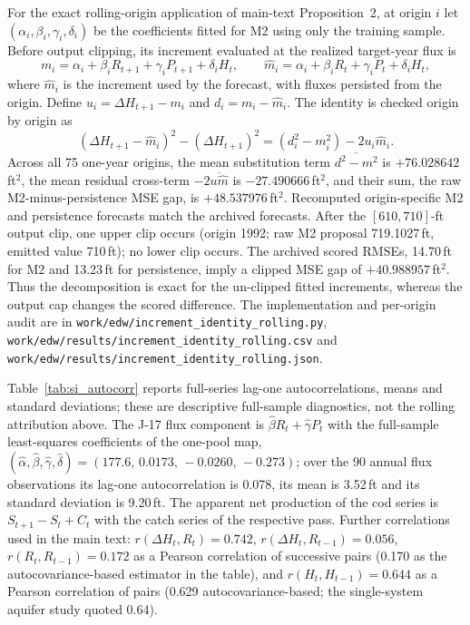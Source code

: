 For the exact rolling-origin application of main-text Proposition~2, at origin $i$ let $(\alpha_i,\beta_i,\gamma_i,\delta_i)$ be the coefficients fitted for M2 using only the training sample. Before output clipping, its increment evaluated at the realized target-year flux is
\[
m_i=\alpha_i+\beta_iR_{t+1}+\gamma_iP_{t+1}+\delta_iH_t,
\qquad \hat m_i=\alpha_i+\beta_iR_t+\gamma_iP_t+\delta_iH_t,
\]
where $\hat m_i$ is the increment used by the forecast, with fluxes persisted from the origin. Define $u_i=\Delta H_{t+1}-m_i$ and $d_i=m_i-\hat m_i$. The identity is checked origin by origin as
\[
(\Delta H_{t+1}-\hat m_i)^2-(\Delta H_{t+1})^2
= (d_i^2-m_i^2)-2u_i\hat m_i.
\]
Across all 75 one-year origins, the mean substitution term $\overline{d^2-m^2}$ is $+76.028642$\,ft$^2$, the mean residual cross-term $-2\overline{u\hat m}$ is $-27.490666$\,ft$^2$, and their sum, the raw M2-minus-persistence MSE gap, is $+48.537976$\,ft$^2$. Recomputed origin-specific M2 and persistence forecasts match the archived forecasts. After the $[610,710]$-ft output clip, one upper clip occurs (origin 1992; raw M2 proposal 719.1027\,ft, emitted value 710\,ft); no lower clip occurs. The archived scored RMSEs, 14.70\,ft for M2 and 13.23\,ft for persistence, imply a clipped MSE gap of $+40.988957$\,ft$^2$. Thus the decomposition is exact for the un-clipped fitted increments, whereas the output cap changes the scored difference. The implementation and per-origin audit are in \texttt{work/edw/increment\_identity\_rolling.py}, \texttt{work/edw/results/increment\_identity\_rolling.csv} and \texttt{work/edw/results/increment\_identity\_rolling.json}.

Table~\ref{tab:si_autocorr} reports full-series lag-one autocorrelations, means and standard deviations; these are descriptive full-sample diagnostics, not the rolling attribution above. The J-17 flux component is $\hat\beta R_t+\hat\gamma P_t$ with the full-sample least-squares coefficients of the one-pool map, $(\hat\alpha,\hat\beta,\hat\gamma,\hat\delta)=(177.6,\,0.0173,\,-0.0260,\,-0.273)$; over the 90 annual flux observations its lag-one autocorrelation is 0.078, its mean is 3.52\,ft and its standard deviation is 9.20\,ft. The apparent net production of the cod series is $S_{t+1}-S_t+C_t$ with the catch series of the respective pass. Further correlations used in the main text: $r(\Delta H_t,R_t)=0.742$, $r(\Delta H_t,R_{t-1})=0.056$, $r(R_t,R_{t-1})=0.172$ as a Pearson correlation of successive pairs (0.170 as the autocovariance-based estimator in the table), and $r(H_t,H_{t-1})=0.644$ as a Pearson correlation of pairs (0.629 autocovariance-based; the single-system aquifer study quoted 0.64).

